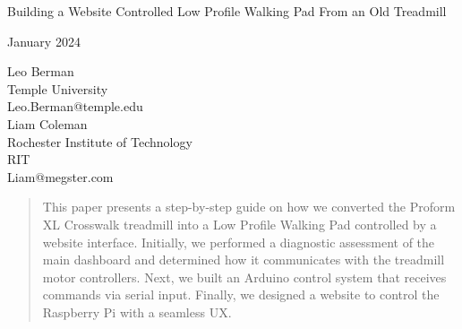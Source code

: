 \documentclass[journal]{IEEEtran}
\begin{document}
\begin{title}{Building a Website Controlled Low Profile Walking Pad From an Old Treadmill\\
    \begin{center}    
        {\large January 2024}
    \end{center}}
\end{title}

\maketitle

\begin{center}
Leo Berman\\
Temple University\\
Leo.Berman@temple.edu\\
{\bigskip}
Liam Coleman\\
Rochester Institute of Technology\\
RIT\\
Liam@megster.com\\
\end{center}
\begin{abstract}
This paper presents a step-by-step guide on how we converted the Proform XL Crosswalk treadmill into a Low Profile Walking Pad controlled by a website interface. Initially, we performed a diagnostic assessment of the main dashboard and determined how it communicates with the treadmill motor controllers. Next, we built an Arduino control system that receives commands via serial input. Finally, we designed a website to control the Raspberry Pi with a seamless UX.
\end{abstract}
\IEEEpeerreviewmaketitle
\end{document}
